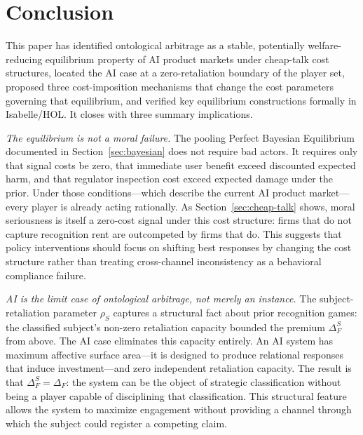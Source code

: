 \section{Conclusion}
\label{sec:conclusion}

This paper has identified ontological arbitrage as a stable, potentially welfare-reducing equilibrium property of AI product markets under cheap-talk cost structures, located the AI case at a zero-retaliation boundary of the player set, proposed three cost-imposition mechanisms that change the cost parameters governing that equilibrium, and verified key equilibrium constructions formally in Isabelle/HOL. It closes with three summary implications.

\emph{The equilibrium is not a moral failure.} The pooling Perfect Bayesian Equilibrium documented in Section~\ref{sec:bayesian} does not require bad actors. It requires only that signal costs be zero, that immediate user benefit exceed discounted expected harm, and that regulator inspection cost exceed expected damage under the prior. Under those conditions---which describe the current AI product market---every player is already acting rationally. As Section~\ref{sec:cheap-talk} shows, moral seriousness is itself a zero-cost signal under this cost structure: firms that do not capture recognition rent are outcompeted by firms that do. This suggests that policy interventions should focus on shifting best responses by changing the cost structure rather than treating cross-channel inconsistency as a behavioral compliance failure.

\emph{AI is the limit case of ontological arbitrage, not merely an instance.} The subject-retaliation parameter $\rho_S$ captures a structural fact about prior recognition games: the classified subject's non-zero retaliation capacity bounded the premium $\Delta_F^S$ from above. The AI case eliminates this capacity entirely. An AI system has maximum affective surface area---it is designed to produce relational responses that induce investment---and zero independent retaliation capacity. The result is that $\Delta_F^S=\Delta_F$: the system can be the object of strategic classification without being a player capable of disciplining that classification. This structural feature allows the system to maximize engagement without providing a channel through which the subject could register a competing claim.

